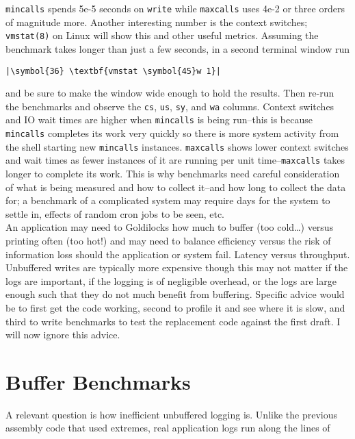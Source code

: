 \documentclass[10pt,a4paper]{article}
\begin{document}
\texttt{mincalls} spends 5e-5 seconds on \texttt{write} while
\texttt{maxcalls} uses 4e-2 or three orders of magnitude more. Another
interesting number is the context switches; \texttt{vmstat(8)} on Linux
will show this and other useful metrics. Assuming the benchmark takes
longer than just a few seconds, in a second terminal window run

\begin{lstlisting}
|\symbol{36} \textbf{vmstat \symbol{45}w 1}|
\end{lstlisting}

and be sure to make the window wide enough to hold the results. Then
re-run the benchmarks and observe the \texttt{cs}, \texttt{us},
\texttt{sy}, and \texttt{wa} columns. Context switches and IO wait times
are higher when \texttt{mincalls} is being run--this is because
\texttt{mincalls} completes its work very quickly so there is more
system activity from the shell starting new \texttt{mincalls} instances.
\texttt{maxcalls} shows lower context switches and wait times as fewer
instances of it are running per unit time--\texttt{maxcalls} takes
longer to complete its work. This is why benchmarks need careful
consideration of what is being measured and how to collect it--and how
long to collect the data for; a benchmark of a complicated system may
require days for the system to settle in, effects of random cron jobs to
be seen, etc. \\

An application may need to Goldilocks how much to buffer (too cold\ldots)
versus printing often (too hot!) and may need to balance efficiency
versus the risk of information loss should the application or system
fail. Latency versus throughput. Unbuffered writes are typically more
expensive though this may not matter if the logs are important, if the
logging is of negligible overhead, or the logs are large enough such
that they do not much benefit from buffering. Specific advice would be
to first get the code working, second to profile it and see where it is
slow, and third to write benchmarks to test the replacement code against
the first draft. I will now ignore this advice.

\section*{Buffer Benchmarks}

A relevant question is how inefficient unbuffered logging is. Unlike the
previous assembly code that used extremes, real application logs run
along the lines of
\end{document}

